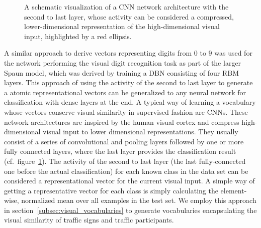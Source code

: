 \begin{figure}[t]
	\centering
	\caption{A schematic visualization of a \ac{CNN} network architecture with the second to last layer, whose activity can be considered a compressed, lower-dimensional representation of the high-dimensional visual input, highlighted by a red ellipsis.}
	\label{fig:cnn_arch}
\end{figure}

A similar approach to derive vectors representing digits from $0$ to $9$ was used \textcite{Eliasmith2012} for the network performing the visual digit recognition task as part of the larger \ac{Spaun} model, which was derived by training a \ac{DBN} consisting of four \acl{RBM} layers.
This approach of using the activity of the second to last layer to generate a atomic representational vectors can be generalized to any neural network for classification with dense layers at the end.
A typical way of learning a vocabulary whose vectors conserve visual similarity in supervised fashion are \acp{CNN}.
These network architectures are inspired by the human visual cortex and compress high-dimensional visual input to lower dimensional representations.
They usually consist of a series of convolutional and pooling layers followed by one or more fully connected layers, where the last layer provides the classification result (cf.\ figure~\ref{fig:cnn_arch}).
The activity of the second to last layer (the last fully-connected one before the actual classification) for each known class in the data set can be considered a representational vector for the current visual input.
A simple way of getting a representative vector for each class is simply calculating the element-wise, normalized mean over all examples in the test set.
We employ this approach in section~\ref{subsec:visual_vocabularies} to generate vocabularies encapsulating the visual similarity of traffic signs and traffic participants.

